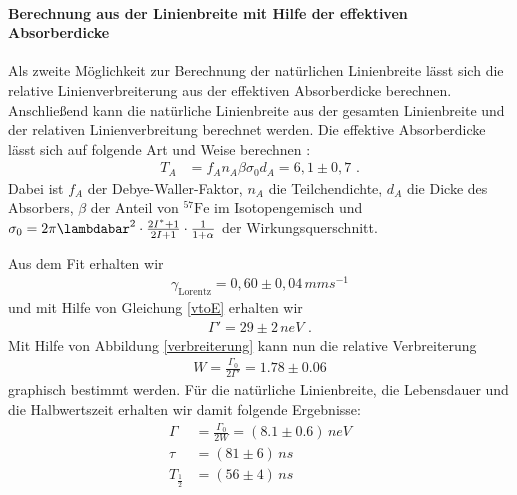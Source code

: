 \paragraph{Berechnung aus der Linienbreite mit Hilfe der effektiven Absorberdicke}
Als zweite Möglichkeit zur Berechnung der natürlichen Linienbreite lässt sich die relative Linienverbreiterung aus der effektiven Absorberdicke berechnen. Anschließend kann die natürliche Linienbreite aus der gesamten Linienbreite und der relativen Linienverbreitung berechnet werden. Die effektive Absorberdicke lässt sich auf folgende Art und Weise berechnen \cite{anleitung}:
\begin{align}
	T_A&=f_An_A\beta\sigma_0d_A=6,1\pm0,7\text{ .}
\end{align}
Dabei ist $f_A$ der Debye-Waller-Faktor, $n_A$ die Teilchendichte, $d_A$ die Dicke des Absorbers, $\beta$ der Anteil von $^{57}\mathrm{Fe}$ im Isotopengemisch und $\sigma_0=2\pi\lambdabar^2\cdot\frac{2I^*+1}{2I+1}\cdot\frac1{1+\alpha}$ der Wirkungsquerschnitt.\\


Aus dem Fit erhalten wir \begin{align}\gamma_\mathrm{Lorentz}=0,60\pm0,04\,\si{mms^{-1}}\end{align} und mit Hilfe von Gleichung \ref{vtoE} erhalten wir \begin{align}\Gamma'=29\pm2\,\si{neV}\text{ .}\end{align} Mit Hilfe von Abbildung \ref{verbreiterung} kann nun die relative Verbreiterung \begin{align}W=\frac{\Gamma_0}{2\Gamma'}=1.78\pm0.06\end{align} graphisch bestimmt werden. Für die natürliche Linienbreite, die Lebensdauer und die Halbwertszeit erhalten wir damit folgende Ergebnisse:
\begin{align}
	\Gamma&=\frac{\Gamma_0}{2W}=(8.1\pm0.6)\,\si{neV}\\
	\tau&=(81\pm6)\,\si{ns}\\
	T_{\frac12}&=(56\pm4)\,\si{ns}
\end{align}
